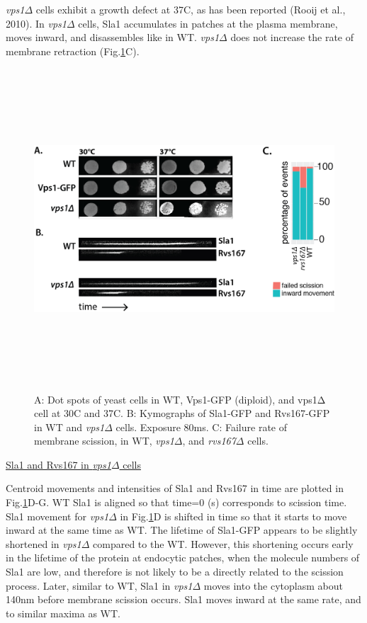 \textit{vps1$\Delta$} cells exhibit a growth defect at 37C, as has been reported (Rooij et al., 2010). In \textit{vps1$\Delta$} cells, Sla1 accumulates in patches at the plasma membrane, moves inward, and disassembles like in WT. \textit{vps1$\Delta$} does not increase the rate of membrane retraction  (Fig.\ref{fig4_vpsdel1}C). 

\vspace{4mm}
	\begin{figure}[H]
	\centering
	\includegraphics[width=12cm,height=12cm,keepaspectratio]{figures/results_final/vps1}
	\caption[Phenotype of \textit{vps1$\Delta$}]
	{A: Dot spots of yeast cells in WT, Vps1-GFP (diploid), and vps1Δ cell at 30C and 37C. 
		B: Kymographs of Sla1-GFP and Rvs167-GFP in WT and \textit{vps1$\Delta$} cells. Exposure 80ms.  
		C: Failure rate of membrane scission, in WT, \textit{vps1$\Delta$}, and \textit{rvs167$\Delta$}  cells. 
		\label{fig4_vpsdel1}}
\end{figure}



\underline{Sla1 and Rvs167 in \textit{vps1$\Delta$} cells}

Centroid movements and intensities of Sla1 and Rvs167 in time are plotted in Fig.\ref{fig4_vpsdel1}D-G. WT Sla1 is aligned so that time=0 (s) corresponds to scission time. Sla1 movement for \textit{vps1$\Delta$}   in Fig.\ref{fig4_vpsdel1}D is shifted in time so that it starts to move inward at the same time as WT. The lifetime of Sla1-GFP appears to be slightly shortened in \textit{vps1$\Delta$}   compared to the WT. However, this shortening occurs early in the lifetime of the protein at endocytic patches, when the molecule numbers of Sla1 are low, and therefore is not likely to be a directly related to the scission process. Later, similar to WT, Sla1 in \textit{vps1$\Delta$}  moves into the cytoplasm about 140nm before membrane scission occurs. Sla1 moves inward at the same rate, and to similar maxima as WT. 


